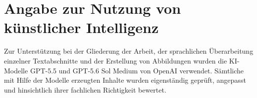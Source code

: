 \section*{Angabe zur Nutzung von künstlicher Intelligenz}
Zur Unterstützung bei der Gliederung der Arbeit, der sprachlichen Überarbeitung einzelner Textabschnitte und der Erstellung von Abbildungen wurden 
die \ac{KI}-Modelle \acs{GPT}-5.5 und \acs{GPT}-5.6 Sol Medium von OpenAI verwendet. Sämtliche mit Hilfe der Modelle erzeugten Inhalte wurden eigenständig geprüft, angepasst und 
hinsichtlich ihrer fachlichen Richtigkeit bewertet.